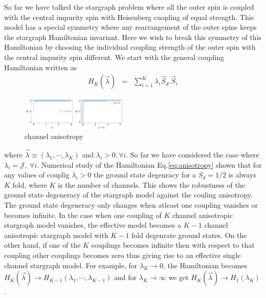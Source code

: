 \documentclass[reprint,prb,superscriptaddress]{revtex4-2}
\begin{document}
\noindent So far we have talked the stargraph problem where all the outer spin is coupled with the central impurity spin with Heisenberg cuopling of equal strength. This model has a special symmetry where any rearrangement of the outer spins keeps the stargraph Hamiltonian invariant. Here we wish to break this symmetry of this Hamiltonian by choosing the individual coupling strength of the outer spin with the central impurity spin different. We start with the general coupling Hamiltonian written as 
\begin{eqnarray}
H_K (\vec{\lambda}) &=& \sum_{i=1}^{K} \lambda_i\vec{S}_d.\vec{S}_i
\label{eq:anisotropy}
\end{eqnarray}

\begin{figure}\centering
\includegraphics[width=0.45\textwidth]{plt/Anisotropy_Channel_3.png}
\caption{channel anisotropy}
\label{fig:channel-anisotropy}
\end{figure}

where $ \vec{\lambda} \equiv (\lambda_1,\cdots,\lambda_K)$ and $\lambda_i>0, \forall i$. So far we have considered the case where $\lambda_i={\mathcal{J}},~\forall i$. Numerical study of the Hamiltonian Eq.\eqref{eq:anisotropy} shown that for any values of couplig $\lambda_i>0$ the ground state degenracy for a $S_d=1/2$ is always $K$ fold, where $K$ is the number of channels. This shows the robustness of the ground state degeneracy of the stargraph model against the couling anisotropy. The ground state degeneracy only changes when atleast one coupling vanishes or becomes infinite. In the case when one coupling of $K$ channel anisotropic stargraph model vanishes, the effective model becomes a $K-1$ channel anisotropic stargraph model with $K-1$ fold degenrate ground states. On the other hand, if one of the $K$ couplings becomes infinite then with respect to that coupling other couplings becomes zero thus giving rise to an effective single channel stargraph model. For example, for $\lambda_K\rightarrow 0$, the Hamiltonian becomes $H_{K}(\vec{\lambda})\rightarrow H_{K-1}(\lambda_1,\cdots,\lambda_{K-1})$ and for $\lambda_K\rightarrow \infty$ we get $H_{K}(\vec{\lambda}) \rightarrow H_{1}(\lambda_K)$. 
\end{document}
